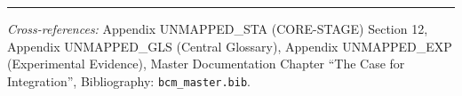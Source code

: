 
\vspace{1em}
\hrule
\vspace{0.5em}

\noindent\textit{Cross-references:}
Appendix UNMAPPED_STA (CORE-STAGE) Section 12,
Appendix UNMAPPED_GLS (Central Glossary),
Appendix UNMAPPED_EXP (Experimental Evidence),
Master Documentation Chapter ``The Case for Integration'',
Bibliography: \texttt{bcm\_master.bib}.

